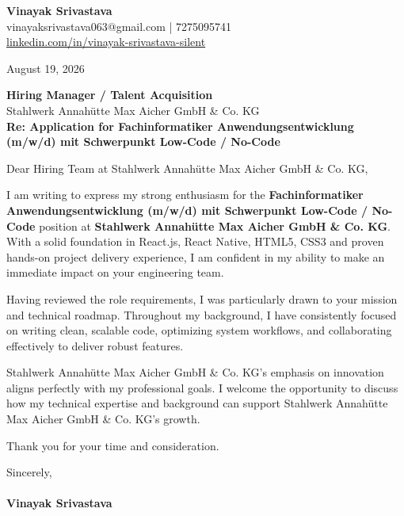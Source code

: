 \documentclass[11pt,a4paper]{article}
\begin{document}
\thispagestyle{empty}

{\Large \textbf{Vinayak Srivastava}}\\
vinayaksrivastava063@gmail.com | 7275095741 \\
\url{linkedin.com/in/vinayak-srivastava-silent}

\vspace{1em}
\hfill August 19, 2026

\textbf{Hiring Manager / Talent Acquisition}\\
Stahlwerk Annahütte  Max Aicher GmbH & Co. KG\\

\vspace{1.5em}
\textbf{Re: Application for Fachinformatiker Anwendungsentwicklung (m/w/d) mit Schwerpunkt Low-Code / No-Code}

\vspace{1em}
Dear Hiring Team at Stahlwerk Annahütte  Max Aicher GmbH & Co. KG,

I am writing to express my strong enthusiasm for the \textbf{Fachinformatiker Anwendungsentwicklung (m/w/d) mit Schwerpunkt Low-Code / No-Code} position at \textbf{Stahlwerk Annahütte  Max Aicher GmbH & Co. KG}. With a solid foundation in React.js, React Native, HTML5, CSS3 and proven hands-on project delivery experience, I am confident in my ability to make an immediate impact on your engineering team.

Having reviewed the role requirements, I was particularly drawn to your mission and technical roadmap. Throughout my background, I have consistently focused on writing clean, scalable code, optimizing system workflows, and collaborating effectively to deliver robust features.

Stahlwerk Annahütte  Max Aicher GmbH & Co. KG's emphasis on innovation aligns perfectly with my professional goals. I welcome the opportunity to discuss how my technical expertise and background can support Stahlwerk Annahütte  Max Aicher GmbH & Co. KG's growth.

Thank you for your time and consideration.

\vspace{1.5em}
Sincerely,\\
\vspace{1em}\\
\textbf{Vinayak Srivastava}
\end{document}
